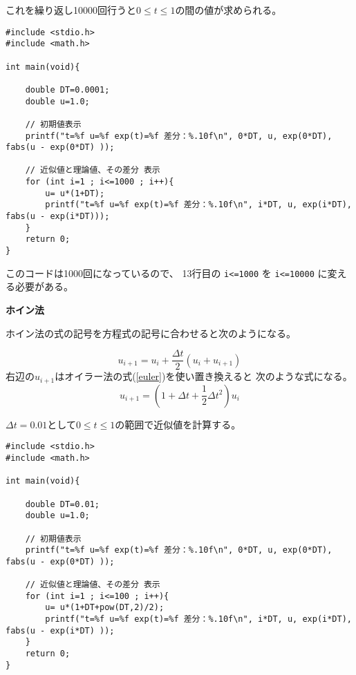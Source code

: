 \documentclass[12pt,b5paper]{ltjsarticle}
\begin{document}
これを繰り返し10000回行うと$0\leq t \leq 1$の間の値が求められる。

\newpage

\begin{lstlisting}
#include <stdio.h>
#include <math.h>

int main(void){

    double DT=0.0001;
    double u=1.0;

    // 初期値表示
    printf("t=%f u=%f exp(t)=%f 差分：%.10f\n", 0*DT, u, exp(0*DT), fabs(u - exp(0*DT) ));

    // 近似値と理論値、その差分 表示
    for (int i=1 ; i<=1000 ; i++){
        u= u*(1+DT);
        printf("t=%f u=%f exp(t)=%f 差分：%.10f\n", i*DT, u, exp(i*DT), fabs(u - exp(i*DT)));
    }
    return 0;
}
\end{lstlisting}

このコードは1000回になっているので、
13行目の \texttt{i<=1000} を
\texttt{i<=10000} に変える必要がある。




\newpage


\dotfill
\textbf{ホイン法}
\dotfill


ホイン法の式の記号を方程式の記号に合わせると次のようになる。

\begin{equation}
 u_{i+1}
 = u_{i} + \frac{\Delta t}{2}\left(  u_{i} +  u_{i+1} \right)
\end{equation}
右辺の$u_{i+1}$はオイラー法の式(\ref{euler})を使い置き換えると
次のような式になる。
\begin{equation}
 u_{i+1}
  =
  \left( 1+\Delta t + \frac{1}{2}\Delta t^2 \right) u_{i}
\end{equation}

$\Delta t = 0.01$として$0\leq t \leq 1$の範囲で近似値を計算する。



\begin{lstlisting}
#include <stdio.h>
#include <math.h>

int main(void){

    double DT=0.01;
    double u=1.0;

    // 初期値表示
    printf("t=%f u=%f exp(t)=%f 差分：%.10f\n", 0*DT, u, exp(0*DT), fabs(u - exp(0*DT) ));

    // 近似値と理論値、その差分 表示
    for (int i=1 ; i<=100 ; i++){
        u= u*(1+DT+pow(DT,2)/2);
        printf("t=%f u=%f exp(t)=%f 差分：%.10f\n", i*DT, u, exp(i*DT), fabs(u - exp(i*DT) ));
    }
    return 0;
}
\end{lstlisting}
\end{document}
